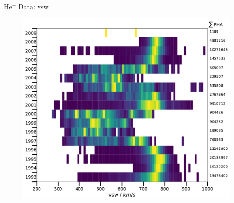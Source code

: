 \documentclass{beamer}
\begin{document}
\begin{frame}[plain]{He$^+$ Data: vsw}
	\begin{figure}
		\includegraphics[scale=.45]{Pics/vsw_all_years_brw.pdf}
	\end{figure}

\end{frame}

%
%
%
\end{document}
